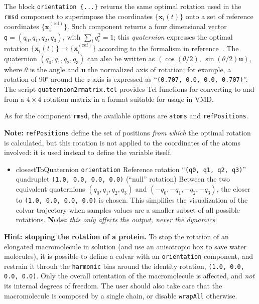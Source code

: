 The block \texttt{orientation~\{...\}} returns the
same optimal rotation used in the \texttt{rmsd} component to
superimpose the coordinates $\{\mathbf{x}_{i}(t)\}$ onto a set of
reference coordinates $\{\mathbf{x}_{i}^{\mathrm{(ref)}}\}$.  Such
component returns a four dimensional vector $\mathsf{q} = (q_0, q_1,
q_2, q_3)$, with $\sum_{i} q_{i}^{2} = 1$; this \emph{quaternion}
expresses the optimal rotation $\{\mathbf{x}_{i}(t)\} \rightarrow
\{\mathbf{x}_{i}^{\mathrm{(ref)}}\}$ according to the formalism in
reference~\cite{Coutsias2004}.  The quaternion $(q_0, q_1, q_2, q_3)$
can also be written as $\left(\cos(\theta/2), \,
  \sin(\theta/2)\mathbf{u}\right)$, where $\theta$ is the angle and
$\mathbf{u}$ the normalized axis of rotation; for example, a rotation
of 90$^{\circ}$ around the $z$ axis is expressed as
``\texttt{(0.707, 0.0, 0.0, 0.707)}''.  The script
\texttt{quaternion2rmatrix.tcl} provides Tcl functions for converting
to and from a $4\times{}4$ rotation matrix in a format suitable for
usage in VMD.

As for the component \texttt{rmsd}, the available options are \texttt{atoms} and \texttt{refPositions}.

\textbf{Note:} \texttt{refPositions} define the set of positions \emph{from which} the optimal rotation is calculated, but this rotation is not applied to the coordinates of the atoms involved: it is used instead to define the variable itself.

\begin{itemize}

\item %
  \keydef
    {closestToQuaternion}{%
    \texttt{orientation}}{%
    Reference rotation}{%
    ``\texttt{(q0, q1, q2, q3)}'' quadruplet}{%
    \texttt{(1.0, 0.0, 0.0, 0.0)} (``null'' rotation)}{%
    Between the two equivalent quaternions $(q_0, q_1, q_2, q_3)$ and
    $(-q_0, -q_1, -q_2, -q_3)$, the closer to \texttt{(1.0, 0.0, 0.0,
      0.0)} is chosen.  This simplifies the visualization of the
    colvar trajectory when samples values are a smaller subset of all
    possible rotations.  \textbf{Note:} \emph {this only affects the
      output, never the dynamics}.}

\end{itemize}

\textbf{Hint: stopping the rotation of a protein.}  To stop the
rotation of an elongated macromolecule in solution (and use an
anisotropic box to save water molecules), it is possible to define a
colvar with an \texttt{orientation} component, and restrain it throuh
the \texttt{harmonic} bias around the identity rotation, \texttt{(1.0,
  0.0, 0.0, 0.0)}.  Only the overall orientation of the macromolecule
is affected, and \emph{not} its internal degrees of freedom.  The user
should also take care that the macromolecule is composed by a single
chain, or disable \texttt{wrapAll} otherwise.



